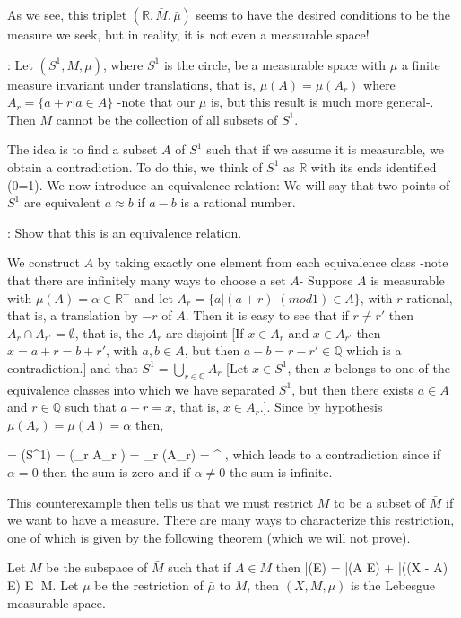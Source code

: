 As we see, this triplet $(\mathbb{R}, \bar{M}, \bar{\mu})$ seems to have the
desired conditions to be the measure we seek, but in reality,
it is not even a measurable space!

\espa
\noi{}: 
Let $(S^1, M, \mu)$, where $S^1$ is the circle, be a
measurable space with $\mu$ a finite measure invariant under translations,
that is, $\mu(A) = \mu(A_r)$ where $A_r = \{a + r | a \in A\}$
-note that our $\bar{\mu}$ is, but this result is much more
general-. Then $M$ cannot be the collection of all
subsets of $S^1$. 

The idea is to find a subset $A$ of $S^1$ such that if we assume
it is measurable, we obtain a contradiction. To do this, we think of
$S^1$ as $\mathbb{R}$ with its ends identified (0=1). We now introduce
an equivalence relation: We will say that two points of $S^1$
are equivalent $a \approx b$ if $a - b$ is a rational number.

\ejer: Show that this is an equivalence relation.

We construct $A$ by taking exactly one element from each equivalence class
-note that there are infinitely many ways to choose a set $A$-
Suppose $A$ is measurable with $\mu(A) = \alpha \in \mathbb{R}^+$ and
let $A_r = \{a | (a + r) \; (mod 1) \in A\}$, with $r$ rational, that is, a
translation by $-r$ of $A$. Then it is easy to see that if $r \neq r'$
then $A_r \cap A_{r'} = \emptyset$, that is, the $A_r$ are
disjoint [If $x \in A_r$ and $x \in A_{r'}$ then $x = a + r = b + r'$, with $a, b
\in A$, but then $a - b = r - r' \in \mathbb{Q}$ which is a contradiction.]
and that $S^1 = \bigcup_{r \in \mathbb{Q}} A_r$ [Let $x \in S^1$, then $x$
belongs to one of the equivalence classes into which we have separated
$S^1$, but then there exists $a \in A$ and $r \in \mathbb{Q}$ such that $a + r
= x$, that is, $x \in A_r$.]. 
Since by hypothesis 
$\mu(A_r) = \mu(A) = \alpha$ then, 

 = \mu(S^1) = \mu \left(\bigcup_{r \in {}} A_r \right) = \sum_{r \in {}} \mu(A_r)
                      = \sum^{\infty} \alpha,
\eeq
which leads to a contradiction since if $\alpha = 0$ then
the sum is zero and if $\alpha \neq 0$ the sum is infinite.

This counterexample then tells us that we must restrict $M$ to be
a subset of $\bar{M}$ if we want to have a measure. There are many ways
to characterize this restriction, one of which is given by the following
theorem (which we will not prove).

\bteo
Let $M$ be the subspace of $\bar{M}$ such that if $A \in M$ then
\beq \bar{\mu}(E) = \bar{\mu}(A \cap E) + \bar{\mu}((X - A) \cap E) 
\; \forall E \in \bar{M}.
\eeq
Let $\mu$ be the restriction of $\bar{\mu}$ to $M$, then
$(X, M, \mu)$ is the Lebesgue measurable space.
\eteo

